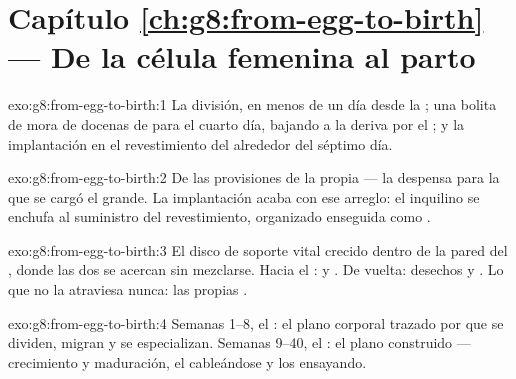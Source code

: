 \section*{Capítulo \ref{ch:g8:from-egg-to-birth} --- De la célula femenina al parto}

\begin{solution}{exo:g8:from-egg-to-birth:1}
La división, en menos de un día desde la ; una bolita de
mora de docenas de  para el cuarto día, bajando a la deriva por
el ; y la implantación en el revestimiento del  alrededor
del séptimo día.
\end{solution}

\begin{solution}{exo:g8:from-egg-to-birth:2}
De las provisiones de la propia   --- la despensa para la
que se cargó el  grande. La implantación acaba con ese arreglo:
el inquilino se enchufa al suministro del revestimiento, organizado
enseguida como .
\end{solution}

\begin{solution}{exo:g8:from-egg-to-birth:3}
El disco de soporte vital crecido dentro de la pared del , donde
las dos  se acercan sin mezclarse. Hacia el : 
y . De vuelta: desechos y . Lo que no la
atraviesa nunca: las propias .
\end{solution}

\begin{solution}{exo:g8:from-egg-to-birth:4}
Semanas 1--8, el : el plano corporal trazado por  que se
dividen, migran y se especializan. Semanas 9--40, el : el plano
construido --- crecimiento y maduración, el  cableándose y los
 ensayando.
\end{solution}

